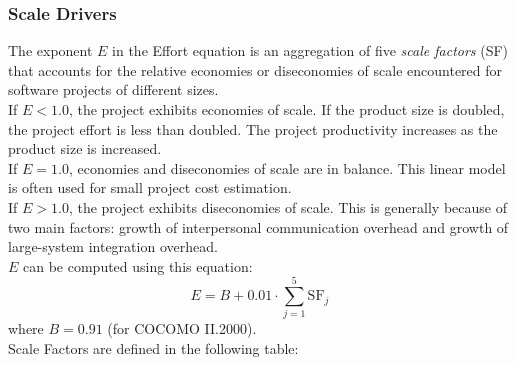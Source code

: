 \subsubsection{Scale Drivers}
The exponent $E$ in the Effort equation is an aggregation of five \textit{scale factors} (SF) that accounts
for the relative economies or diseconomies of scale encountered for software projects of different
sizes. \\
If $E < 1.0$, the project exhibits economies of scale. If the product
size is doubled, the project effort is less than doubled. The project productivity increases as the
product size is increased. \\
If $E = 1.0$, economies and diseconomies of scale are in balance. This linear model is
often used for small project cost estimation. \\
If $E > 1.0$, the project exhibits diseconomies of scale. This is generally because of two
main factors: growth of interpersonal communication overhead and growth of large-system
integration overhead. \\
$E$ can be computed using this equation:
$$ E = B + 0.01 \cdot \sum_{j=1}^{5} \textrm{SF}_j $$
where $B = 0.91$ (for COCOMO II.2000). \\
Scale Factors are defined in the following table:
\label{sec:sd}
